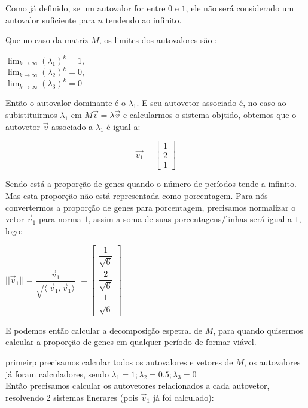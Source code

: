 \documentclass[14pt]{article}
\begin{document}
Como já definido, se um autovalor for entre $0$ e $1$, ele não será considerado um autovalor suficiente para $n$ tendendo ao infinito.

Que no caso da matriz $M$, os limites dos autovalores são :
\begin{center}
    $\lim_{k\to\infty} (\lambda_1)^k = 1$,\\
    $\lim_{k\to\infty} (\lambda_2)^k = 0$,\\
    $\lim_{k\to\infty} (\lambda_3)^k = 0$
\end{center}

Então o autovalor dominante é o $\lambda_1$. E seu autovetor associado é, no caso ao subistituirmos $\lambda_1$ em $M\vec{v} = \lambda \vec{v}$ e calcularmos o sistema objtido, obtemos que o autovetor $\vec{v}$ associado a $\lambda_1$ é igual a:

\begin{displaymath}
\vec{v_1} = \begin{bmatrix}
1\\
2\\
1
\end{bmatrix}
\end{displaymath}

Sendo está a proporção de genes quando o número de períodos tende a infinito.
Mas esta proporção não está representada como porcentagem. Para nós convertermos a proporção de genes para porcentagem, precisamos normalizar o vetor $\vec{v}_1$ para norma $1$, assim a soma de suas porcentagens/linhas será igual a $1$, logo:
\begin{center}
    $||\vec{v}_1|| = \dfrac{\vec{v}_1}{\sqrt{\langle\ \vec{v}_1,\vec{v}_1 \rangle}}$
    $ = \begin{bmatrix} \dfrac{1}{\sqrt{6}}\\ \dfrac{2}{\sqrt{6}}\\ \dfrac{1}{\sqrt{6}} \end{bmatrix}$
\end{center}

E podemos então calcular a decomposição espetral de $M$, para quando quisermos calcular a proporção de genes em qualquer período de formar viável.

primeirp precisamos calcular todos os autovalores e vetores de $M$, os autovalores já foram calculadores, sendo $\lambda_1 = 1; \lambda_2 = 0.5; \lambda_3 = 0$\\

Então precisamos calcular os autovetores relacionados a cada autovetor, resolvendo 2 sistemas linerares (pois $\vec{v}_1$ já foi calculado):\\
\end{document}
